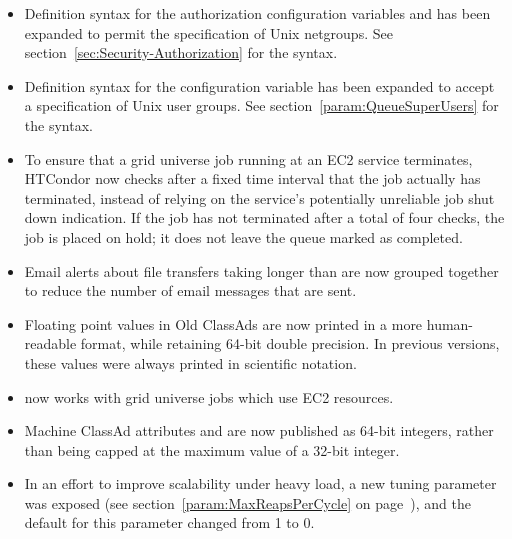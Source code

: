 \begin{itemize}

\item Definition syntax for the authorization configuration variables
 and  has been expanded to permit
the specification of Unix netgroups.
See section~\ref{sec:Security-Authorization} for the syntax.

\item Definition syntax for the configuration variable
 has been expanded to accept a specification
of Unix user groups.
See section~\ref{param:QueueSuperUsers} for the syntax.

\item To ensure that a grid universe job running at an EC2 service
terminates, 
HTCondor now checks after a fixed time interval 
that the job actually has terminated,
instead of relying on the service's potentially unreliable 
job shut down indication.
If the job has not terminated after a total of four checks,
the job is placed on hold; it does not leave the queue marked as completed.

\item Email alerts about file transfers taking longer than
 are now grouped together
to reduce the number of email messages that are sent.

\item Floating point values in Old ClassAds are now printed in a more
human-readable format, while retaining 64-bit double precision.
In previous versions, these values were always printed in scientific
notation.

\item {} now works with grid universe jobs
which use EC2 resources.

\item Machine ClassAd attributes  and  
are now published as 64-bit integers,
rather than being capped at the maximum value of a 32-bit integer.

\item In an effort to improve scalability under heavy load, a new tuning
	parameter  was exposed (see
	section~\ref{param:MaxReapsPerCycle} on
	page~\pageref{param:MaxReapsPerCycle}), and the default for this parameter
	changed from 1 to 0.

\end{itemize}


